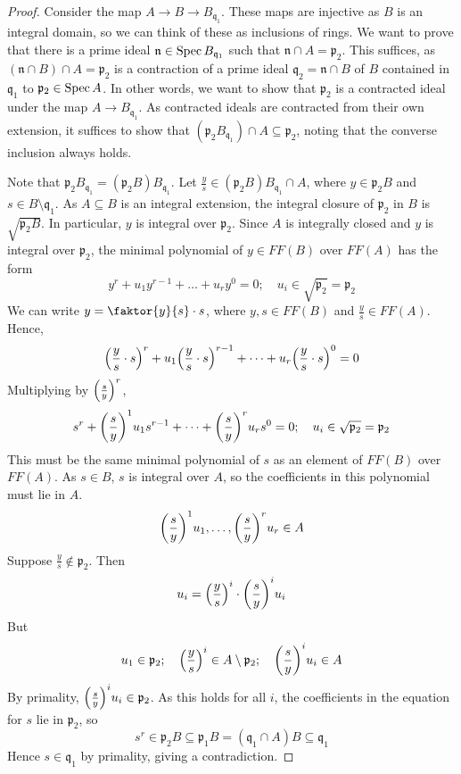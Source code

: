 \begin{proof}
    Consider the map \( A \to B \to B_{\mathfrak q_1} \).
    These maps are injective as \( B \) is an integral domain, so we can think of these as inclusions of rings.
    We want to prove that there is a prime ideal \( \mathfrak n \in \operatorname{Spec} B_{\mathfrak q_1} \) such that \( \mathfrak n \cap A = \mathfrak p_2 \).
    This suffices, as \( (\mathfrak n \cap B) \cap A = \mathfrak p_2 \) is a contraction of a prime ideal \( \mathfrak q_2 = \mathfrak n \cap B \) of \( B \) contained in \( \mathfrak q_1 \) to \( \mathfrak p_2 \in \operatorname{Spec} A \).
    In other words, we want to show that \( \mathfrak p_2 \) is a contracted ideal under the map \( A \to B_{\mathfrak q_1} \).
    As contracted ideals are contracted from their own extension, it suffices to show that \( (\mathfrak p_2 B_{\mathfrak q_1}) \cap A \subseteq \mathfrak p_2 \), noting that the converse inclusion always holds.
    
    Note that \( \mathfrak p_2 B_{\mathfrak q_1} = (\mathfrak p_2 B) B_{\mathfrak q_1} \).
    Let \( \frac{y}{s} \in (\mathfrak p_2 B) B_{\mathfrak q_1} \cap A \), where \( y \in \mathfrak p_2 B \) and \( s \in B \setminus \mathfrak q_1 \).
    As \( A \subseteq B \) is an integral extension, the integral closure of \( \mathfrak p_2 \) in \( B \) is \( \sqrt{\mathfrak p_2 B} \).
    In particular, \( y \) is integral over \( \mathfrak p_2 \).
    Since \( A \) is integrally closed and \( y \) is integral over \( \mathfrak p_2 \), the minimal polynomial of \( y \in FF(B) \) over \( FF(A) \) has the form
    \[ y^r + u_1 y^{r-1} + \dots + u_r y^0 = 0;\quad u_i \in \sqrt{\mathfrak p_2} = \mathfrak p_2 \]
    We can write \( y = \faktor{y}{s} \cdot s \), where \( y, s \in FF(B) \) and \( \frac{y}{s} \in FF(A) \).
    Hence,
    \[ \qty(\frac{y}{s} \cdot s)^r + u_1 \qty(\frac{y}{s} \cdot s)^{r-1} + \dots + u_r \qty(\frac{y}{s} \cdot s)^0 = 0 \]
    Multiplying by \( \qty(\frac{s}{y})^r \),
    \[ s^r + \qty(\frac{s}{y})^1 u_1 s^{r-1} + \dots + \qty(\frac{s}{y})^r u_r s^0 = 0;\quad u_i \in \sqrt{\mathfrak p_2} = \mathfrak p_2 \]
    This must be the same minimal polynomial of \( s \) as an element of \( FF(B) \) over \( FF(A) \).
    As \( s \in B \), \( s \) is integral over \( A \), so the coefficients in this polynomial must lie in \( A \).
    \[ \qty(\frac{s}{y})^1 u_1, \dots, \qty(\frac{s}{y})^r u_r \in A \]
    Suppose \( \frac{y}{s} \notin \mathfrak p_2 \).
    Then
    \[ u_i = \qty(\frac{y}{s})^i \cdot \qty(\frac{s}{y})^i u_i \]
    But
    \[ u_1 \in \mathfrak p_2;\quad \qty(\frac{y}{s})^i \in A \setminus \mathfrak p_2;\quad \qty(\frac{s}{y})^i u_i \in A \]
    By primality, \( \qty(\frac{s}{y})^i u_i \in \mathfrak p_2 \).
    As this holds for all \( i \), the coefficients in the equation for \( s \) lie in \( \mathfrak p_2 \), so
    \[ s^r \in \mathfrak p_2 B \subseteq \mathfrak p_1 B = (\mathfrak q_1 \cap A) B \subseteq \mathfrak q_1 \]
    Hence \( s \in \mathfrak q_1 \) by primality, giving a contradiction.
\end{proof}
